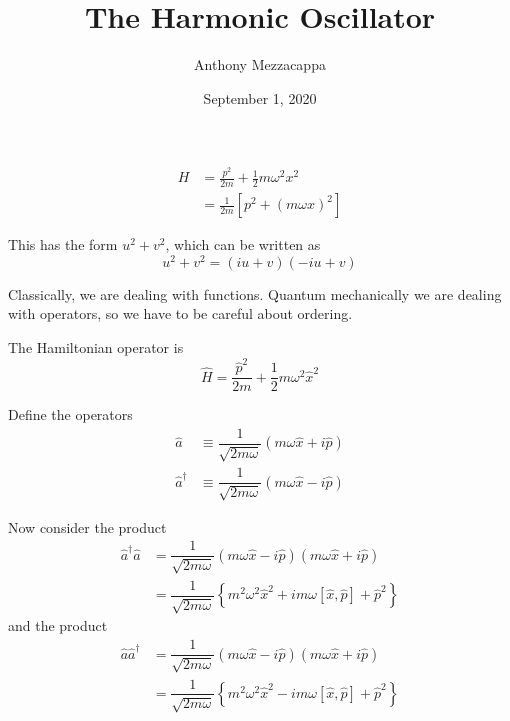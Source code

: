 \documentclass{article}
\title{The Harmonic Oscillator}
\author{Anthony Mezzacappa}
\date{September 1, 2020}
\begin{document}
\maketitle

\begin{align}
H &= \frac{p^2}{2m} + \frac{1}{2} m \omega^2 x^2 \nonumber\\
  &= \frac{1}{2m} \left[ p^2 + {\left( m \omega x \right)}^2 \right]
\end{align}

\noindent This has the form $u^2 + v^2$, which can be written as
\begin{equation}
u^2 + v^2 = ( i u + v ) ( -i u + v )
\end{equation}

\noindent Classically, we are dealing with functions. Quantum mechanically we are dealing with operators, so we have to be careful about ordering.

\noindent The Hamiltonian operator is
\begin{equation}
\hat{H} = \frac{\hat{p}^2}{2m} + \frac{1}{2} m \omega^2 \hat{x}^2
\end{equation}

\noindent Define the operators
\begin{align}
\hat{a} &\equiv \dfrac{1}{\sqrt{2 m \omega}} ( m \omega \hat{x} + i \hat{p} ) \\
\hat{a}^\dagger &\equiv \dfrac{1}{\sqrt{2 m \omega}} ( m \omega \hat{x} - i \hat{p} )
\end{align}


\noindent Now consider the product
\begin{equation}
\begin{aligned}
\hat{a}^\dagger \hat{a} &= \dfrac{1}{\sqrt{2 m \omega}} ( m \omega \hat{x} - i \hat{p} ) ( m \omega \hat{x} + i \hat{p} ) \\
&= \dfrac{1}{\sqrt{2 m \omega}} \left\lbrace m^2 \omega^2 \hat{x}^2 + i m \omega [ \hat{x}, \hat{p} ] + \hat{p}^2 \right\rbrace
\end{aligned}
\end{equation}
and the product
\begin{align}
\hat{a} \hat{a}^\dagger &= \dfrac{1}{\sqrt{2 m \omega}} ( m \omega \hat{x} - i \hat{p} ) ( m \omega \hat{x} + i \hat{p} ) \nonumber\\
&= \dfrac{1}{\sqrt{2 m \omega}} \left\lbrace m^2 \omega^2 \hat{x}^2 - i m \omega [ \hat{x}, \hat{p} ] + \hat{p}^2 \right\rbrace
\end{align}
\end{document}
